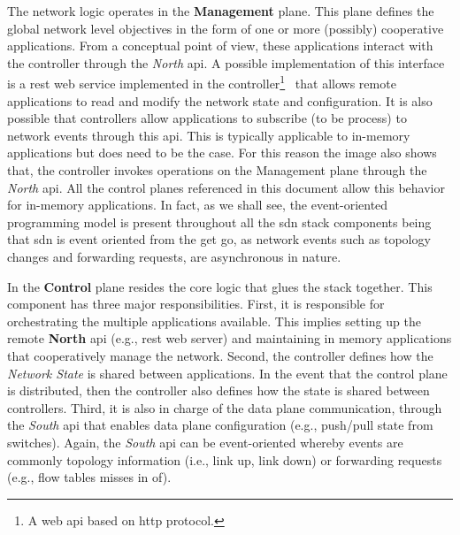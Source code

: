 The network logic operates in the \textbf{Management} plane. 
This plane defines the global network level objectives in the form of one or more (possibly) cooperative applications. 
From a conceptual point of view, these applications interact with the controller through the \emph{North} \gls{api}. 
A possible implementation of this interface is a \gls{rest}  web service implemented in the controller\footnote{A web \gls{api} based on \gls{http} protocol.}~\cite{fielding2002principled} that allows remote applications to read and modify the network state and configuration.  
It is also possible that controllers allow applications to subscribe (to be process) to network events through this \gls{api}. 
This is typically applicable to in-memory applications but does need to be the case. 
For this reason the image also shows that, the controller invokes operations on  the Management plane through the \emph{North} \gls{api}. 
All the control planes referenced in this document allow this behavior for in-memory applications. 
In fact, as we shall see, the event-oriented programming model is present throughout all the \gls{sdn} stack components  being that  \gls{sdn} is event oriented from the get go, as network events  such as  topology changes and forwarding requests, are asynchronous in nature. 

In the \textbf{Control} plane resides the core logic that glues the stack together. 
This component has three major responsibilities. 
First, it is responsible for orchestrating the multiple applications available.
This implies setting up the remote \textbf{North} \gls{api} (e.g., \gls{rest} web server) and maintaining in memory applications that cooperatively manage the network. 
Second, the controller  defines how the \emph{Network State} is shared between  applications. 
In the event that the control plane is distributed, then the controller also defines how the state is shared between controllers. 
Third, it is also in charge of the data plane communication, through the \emph{South} \gls{api}  that enables data plane configuration (e.g., push/pull state from switches). 
Again, the \emph{South}  \gls{api} can be event-oriented whereby events are commonly topology information (i.e., link up, link down) or forwarding requests (e.g., flow tables misses in \gls{of}). 


